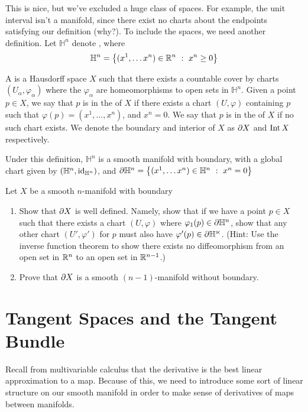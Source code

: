 This is nice, but we've excluded a huge class of spaces. For example, the
unit interval isn't a manifold, since there exist no charts about the
endpoints satisfying our definition (why?). To include the spaces, we
need another definition. Let $\mathbb{H}^n$ denote
, where
$$\mathbb{H}^n = \left\lbrace (x^1, \ldots x^n) \in \mathbb{R}^n ~:~ x^n \geq 0 \right\rbrace $$
%
\begin{defn}
	A  is a Hausdorff space $X$ such that there
	exists a countable cover by charts $(U_\alpha, \varphi_\alpha)$ where
	the $\varphi_\alpha$ are homeomorphisms to open sets in $\mathbb{H}^n$.
	Given a point $p \in X$, we say that $p$ is in the  of
	$X$ if there exists a chart $(U, \varphi)$ containing $p$ such that
	$\varphi(p) = (x^1, \ldots, x^n)$, and $x^n = 0$. We say that $p$ is in
	the  of $X$ if no such chart exists. We denote the boundary
	and interior of $X$ as $\partial X$ and $\operatorname{Int} X$ respectively.
\end{defn}
%
Under this definition, $\mathbb{H}^n$ is a smooth manifold with boundary,
with a global chart given by $(\mathbb{H}^n, \operatorname{id}_{\mathbb{H}^n})$, and
$\partial \mathbb{H}^n = \left\lbrace (x^1, \ldots x^n) \in \mathbb{H}^n ~:~ x^n = 0 \right\rbrace$
%
\begin{exer}
	Let $X$ be a smooth $n$-manifold with boundary
	\begin{enumerate}
		\item Show that $\partial X$ is
		well defined. Namely, show that if we have a point $p \in X$ such that
		there exists a chart $(U, \varphi)$ where $\varphi_1(p) \in \partial
		\mathbb{H}^n$, show that any other chart $(U', \varphi')$ for $p$ must
		also have $\varphi'(p) \in \partial \mathbb{H^n}$. (Hint: Use the inverse
		function theorem to show there exists no diffeomorphism from an open set
		in $\mathbb{R}^n$ to an open set in $\mathbb{R}^{n-1}$.)
		\item Prove that $\partial X$ is a smooth $(n-1)$-manifold without boundary.
	\end{enumerate}
\end{exer}
%
\section{Tangent Spaces and the Tangent Bundle}
%
Recall from multivariable calculus that the derivative is the best linear
approximation to a map. Because of this, we need to introduce some sort
of linear structure on our smooth manifold in order to make sense of
derivatives of maps between manifolds. \\

